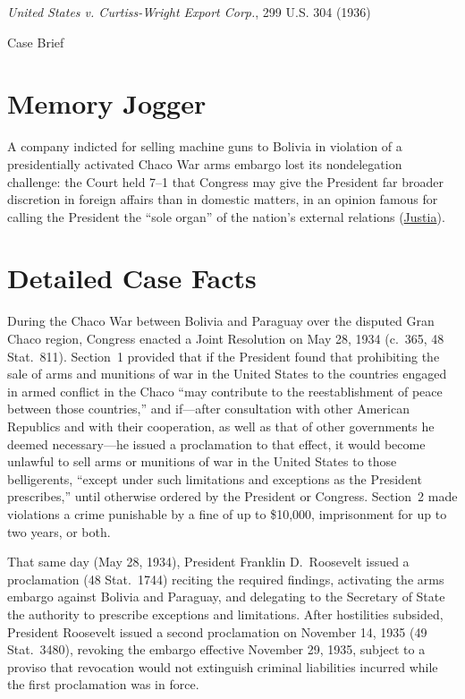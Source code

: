 \documentclass[12pt]{article}
\begin{document}
\begin{center}
{\LARGE \textit{United States v. Curtiss-Wright Export Corp.}, 299 U.S. 304 (1936)\par}
\vspace{0.8em}
{\large Case Brief\par}
\end{center}
\vspace{1em}

\section{Memory Jogger}
A company indicted for selling machine guns to Bolivia in violation of a presidentially activated Chaco War arms embargo lost its nondelegation challenge: the Court held 7--1 that Congress may give the President far broader discretion in foreign affairs than in domestic matters, in an opinion famous for calling the President the ``sole organ'' of the nation's external relations (\href{https://supreme.justia.com/cases/federal/us/299/304/}{Justia}).

\section{Detailed Case Facts}
During the Chaco War between Bolivia and Paraguay over the disputed Gran Chaco region, Congress enacted a Joint Resolution on May 28, 1934 (c.\ 365, 48 Stat.\ 811). Section~1 provided that if the President found that prohibiting the sale of arms and munitions of war in the United States to the countries engaged in armed conflict in the Chaco ``may contribute to the reestablishment of peace between those countries,'' and if---after consultation with other American Republics and with their cooperation, as well as that of other governments he deemed necessary---he issued a proclamation to that effect, it would become unlawful to sell arms or munitions of war in the United States to those belligerents, ``except under such limitations and exceptions as the President prescribes,'' until otherwise ordered by the President or Congress. Section~2 made violations a crime punishable by a fine of up to \$10,000, imprisonment for up to two years, or both.

That same day (May 28, 1934), President Franklin D.\ Roosevelt issued a proclamation (48 Stat.\ 1744) reciting the required findings, activating the arms embargo against Bolivia and Paraguay, and delegating to the Secretary of State the authority to prescribe exceptions and limitations. After hostilities subsided, President Roosevelt issued a second proclamation on November 14, 1935 (49 Stat.\ 3480), revoking the embargo effective November 29, 1935, subject to a proviso that revocation would not extinguish criminal liabilities incurred while the first proclamation was in force.
\end{document}
